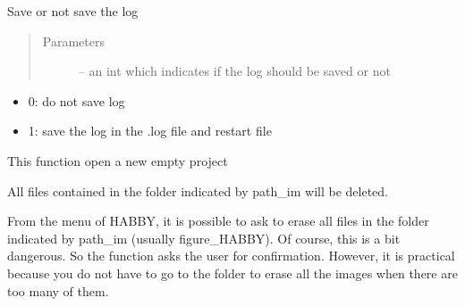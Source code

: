 \documentclass[letterpaper,10pt,english]{sphinxmanual}
\begin{document}
\begin{fulllineitems}
\begin{fulllineitems}
\end{fulllineitems}


\begin{fulllineitems}
\label{\detokenize{index:src_GUI.Main_windows_1.MainWindows.do_log}}
Save or not save the log
\begin{quote}\begin{description}
\item[{Parameters}] \leavevmode
{} -- an int which indicates if the log should be saved or not

\end{description}\end{quote}
\begin{itemize}
\item {} 
0: do not save log

\item {} 
1: save the log in the .log file and restart file

\end{itemize}

\end{fulllineitems}


\begin{fulllineitems}
\label{\detokenize{index:src_GUI.Main_windows_1.MainWindows.empty_project}}
This function open a new empty project

\end{fulllineitems}


\begin{fulllineitems}
\label{\detokenize{index:src_GUI.Main_windows_1.MainWindows.erase_pict}}
All files contained in the folder indicated by path\_im will be deleted.

From the menu of HABBY, it is possible to ask to erase all files in the folder indicated by path\_im
(usually figure\_HABBY). Of course, this is a bit dangerous. So the function asks the user for confirmation.
However, it is practical because you do not have to go to the folder to erase all the images when there
are too many of them.


\end{fulllineitems}
\end{fulllineitems}
\end{document}
